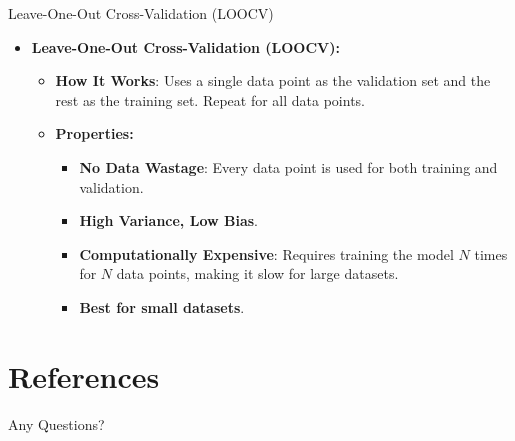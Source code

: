 \documentclass[serif, aspectratio=169]{beamer}
\begin{document}
\begin{frame}{Leave-One-Out Cross-Validation (LOOCV)}
    \begin{itemize}
        \item \textbf{Leave-One-Out Cross-Validation (LOOCV):}
            \medskip
            \begin{itemize}\itemsep1em
            \item \justifying \textbf{How It Works}: 
            Uses a single data point as the validation set and the rest as the training set. Repeat for all data points.
            \item \textbf{Properties:}
            \smallskip
            \begin{itemize}\itemsep.5em
                \item \textbf{No Data Wastage}:
                Every data point is used for both training and validation.
                \item \textbf{High Variance, Low Bias}.
                \item \justifying \textbf{Computationally Expensive}: 
                Requires training the model $N$ times for $N$ data points, making it slow for large datasets.
                \item \textbf{Best for small datasets}.
            \end{itemize}
        \end{itemize}
    \end{itemize}
\end{frame}

\section{References}

\begin{frame}[allowframebreaks]
    
    
    \nocite{*} %
\end{frame}


\begin{frame}
    \begin{center}
        {\Huge Any Questions?}
    \end{center}
\end{frame}
\end{document}
